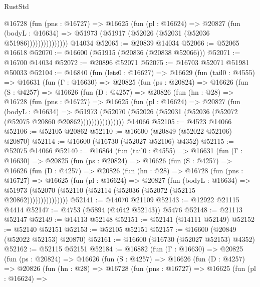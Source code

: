 \begin{lexlean}{RustStd}
\begin{coremodule}
                  @16728
                    (fun (pns : @16727) =>
                    @16625
                      (fun (pl : @16624) =>
                      @20827
                        (fun (bodyL : @16634) =>
                        @51973 (@51917 (@52026 (@52031 (@52036 @51986)))))))))))))))
    @14034
@52065 := @20839 @14034
@52066 := @52065 @16618
@52070 := @16600 (@51915 (@20836 (@20838 @52066)))
@52071 := @16700 @14034
@52072 := @20896 @52071
@52075 := @16703 @52071 @51981 @50033
@52104 := @16840
    (fun (lets0 : @16627) =>
    @16629
      (fun (tail0 : @4555) =>
      @16631
        (fun (Γ : @16630) =>
        @20825
          (fun (ps : @20824) =>
          @16626
            (fun (S : @4257) =>
            @16626
              (fun (D : @4257) =>
              @20826
                (fun (hn : @28) =>
                @16728
                  (fun (pns : @16727) =>
                  @16625
                    (fun (pl : @16624) =>
                    @20827
                      (fun (bodyL : @16634) =>
                      @51973
                        (@52070
                          (@52026 (@52031 (@52036 (@52072 (@52075 @20860 @20862))))))))))))))))
    @14066
@52105 := @4523 @14066
@52106 := @52105 @20862
@52110 := @16600 (@20849 (@52022 @52106) @20870)
@52114 := @16600 (@16730 (@52027 @52106) @4352)
@52115 := @52075 @14066
@52140 := @16864
    (fun (tail0 : @4555) =>
    @16631
      (fun (Γ : @16630) =>
      @20825
        (fun (ps : @20824) =>
        @16626
          (fun (S : @4257) =>
          @16626
            (fun (D : @4257) =>
            @20826
              (fun (hn : @28) =>
              @16728
                (fun (pns : @16727) =>
                @16625
                  (fun (pl : @16624) =>
                  @20827
                    (fun (bodyL : @16634) =>
                    @51973 (@52070 (@52110 (@52114 (@52036 (@52072 (@52115 @20862)))))))))))))))
@52141 := @14070 @21109
@52143 := @12922 @21115 @4414
@52147 := @4753 (@5894 (@4642 @52143)) @5476
@52148 := @21113 @52147
@52149 := @14113 @52148
@52151 := @52141 (@14111 @52149)
@52152 := @52140 @52151
@52153 := @52105 @52151
@52157 := @16600 (@20849 (@52022 @52153) @20870)
@52161 := @16600 (@16730 (@52027 @52153) @4352)
@52162 := @52115 @52151
@52184 := @16882
    (fun (Γ : @16630) =>
    @20825
      (fun (ps : @20824) =>
      @16626
        (fun (S : @4257) =>
        @16626
          (fun (D : @4257) =>
          @20826
            (fun (hn : @28) =>
            @16728
              (fun (pns : @16727) =>
              @16625
                (fun (pl : @16624) =>

\end{coremodule}
\end{lexlean}
